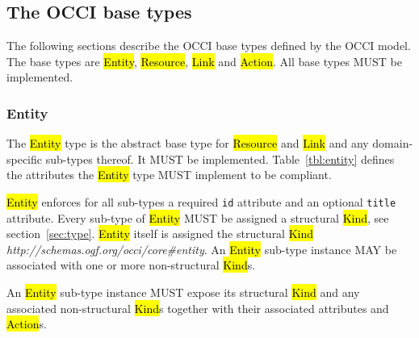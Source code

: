 \documentclass[10pt,a4paper,british]{article}
\begin{document}


\subsection{The OCCI base types}
\label{sec:base_types}
The following sections describe the OCCI base types defined by the OCCI model.
The base types are \hl{Entity}, \hl{Resource}, \hl{Link} and \hl{Action}. All
base types MUST be implemented.

\subsubsection{Entity}
\label{sec:entity}
The \hl{Entity} type is the abstract base type for \hl{Resource} and \hl{Link}
and any domain-specific sub-types thereof. It MUST be implemented.
%
Table~\ref{tbl:entity} defines the attributes the \hl{Entity} type MUST implement to
be compliant.


\hl{Entity} enforces for all sub-types a required \texttt{id} attribute and an
optional \texttt{title} attribute.
%
Every sub-type of \hl{Entity} MUST be assigned a structural \hl{Kind}, see
section~\ref{sec:type}. \hl{Entity} itself is assigned the structural \hl{Kind}
\textit{http://schemas.ogf.org/occi/core\#entity}.
%
An \hl{Entity} sub-type instance MAY be associated with one or more non-structural
\hl{Kind}s.

An \hl{Entity} sub-type instance MUST expose its structural \hl{Kind} and any
associated non-structural \hl{Kind}s together with their associated attributes
and \hl{Action}s.
\end{document}
